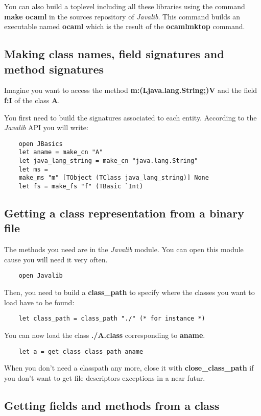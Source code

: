 \documentclass{article}
\begin{document}
You can also build a toplevel including all these libraries using
the command \textbf{make ocaml} in the sources repository of
\emph{Javalib}. This command builds an executable named
\textbf{ocaml} which is the result of the \textbf{ocamlmktop}
command.

\subsection{Making class names, field signatures and method signatures}

Imagine you want to access the method
\textbf{m:(Ljava.lang.String;)V} and the field \textbf{f:I} of the
class \textbf{A}.

You first need to build the signatures associated to each entity.
According to the \emph{Javalib} API you will write:

\begin{verbatim}
    open JBasics
    let aname = make_cn "A"
    let java_lang_string = make_cn "java.lang.String"
    let ms =
    make_ms "m" [TObject (TClass java_lang_string)] None
    let fs = make_fs "f" (TBasic `Int)
\end{verbatim}
\subsection{Getting a class representation from a binary file}

The methods you need are in the \emph{Javalib} module. You can open
this module cause you will need it very often.

\begin{verbatim}
    open Javalib
\end{verbatim}
Then, you need to build a \textbf{class\_path} to specify where the
classes you want to load have to be found:

\begin{verbatim}
    let class_path = class_path "./" (* for instance *)
\end{verbatim}
You can now load the class \textbf{./A.class} corresponding to
\textbf{aname}.

\begin{verbatim}
    let a = get_class class_path aname
\end{verbatim}
When you don't need a classpath any more, close it with
\textbf{close\_class\_path} if you don't want to get file
descriptors exceptions in a near futur.

\subsection{Getting fields and methods from a class}
\end{document}
